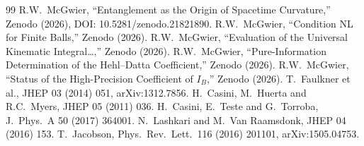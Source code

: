 \documentclass[11pt]{article}
\begin{document}
\begin{thebibliography}{99}
 R.W.\ McGwier, ``Entanglement as the Origin of Spacetime Curvature,'' Zenodo (2026), DOI: 10.5281/zenodo.21821890.
 R.W.\ McGwier, ``Condition NL for Finite Balls,'' Zenodo (2026).
 R.W.\ McGwier, ``Evaluation of the Universal Kinematic Integral\ldots,'' Zenodo (2026).
 R.W.\ McGwier, ``Pure-Information Determination of the Hehl--Datta Coefficient,'' Zenodo (2026).
 R.W.\ McGwier, ``Status of the High-Precision Coefficient of $I_B$,'' Zenodo (2026).
 T.\ Faulkner et al., JHEP 03 (2014) 051, arXiv:1312.7856.
 H.\ Casini, M.\ Huerta and R.C.\ Myers, JHEP 05 (2011) 036.
 H.\ Casini, E.\ Teste and G.\ Torroba, J.\ Phys.\ A 50 (2017) 364001.
 N.\ Lashkari and M.\ Van Raamsdonk, JHEP 04 (2016) 153.
 T.\ Jacobson, Phys.\ Rev.\ Lett.\ 116 (2016) 201101, arXiv:1505.04753.
\end{thebibliography}
\end{document}
